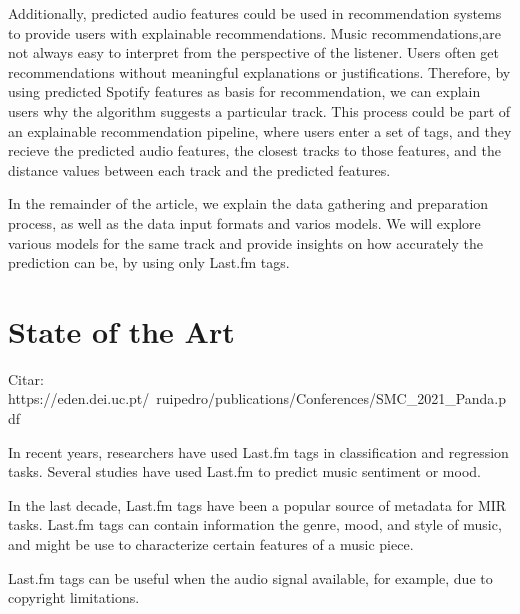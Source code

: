 \documentclass[sn-mathphys]{sn-jnl}%
\theoremstyle{thmstyleone}%
\theoremstyle{thmstyletwo}%
\theoremstyle{thmstylethree}%
\begin{document}
Additionally, predicted audio features could be used in recommendation systems to provide users with explainable recommendations.
Music recommendations,are not always easy to interpret from the perspective of the listener.
Users often get recommendations without meaningful explanations or justifications.
Therefore, by using predicted Spotify features as basis for recommendation, we can explain users why the algorithm suggests a particular track.
This process could be part of an explainable recommendation pipeline, where users enter a set of tags,
and they recieve the predicted audio features, the closest tracks to those features, and the distance values between each track and the predicted features.


In the remainder of the article, we explain the data gathering and preparation process, as well as the data input formats and varios models.
We will explore various models for the same track and provide insights on how accurately the prediction can be, by using only Last.fm tags.

\section{State of the Art}

Citar: https://eden.dei.uc.pt/~ruipedro/publications/Conferences/SMC_2021_Panda.pdf

In recent years, researchers have used Last.fm tags in classification and regression tasks.
Several studies have used Last.fm to predict music sentiment or mood.



In the last decade, Last.fm tags have been a popular source of metadata for MIR tasks.
Last.fm tags can contain information the genre, mood, and style of music,
and might be use to characterize certain features of a music piece.


Last.fm tags can be useful when the audio signal available,
for example, due to copyright limitations.
\end{document}
